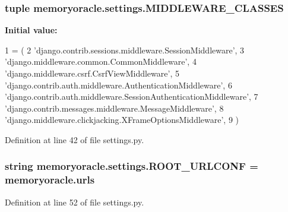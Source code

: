 \subsubsection[{M\+I\+D\+D\+L\+E\+W\+A\+R\+E\+\_\+\+C\+L\+A\+S\+S\+E\+S}]{\setlength{\rightskip}{0pt plus 5cm}tuple memoryoracle.\+settings.\+M\+I\+D\+D\+L\+E\+W\+A\+R\+E\+\_\+\+C\+L\+A\+S\+S\+E\+S}\label{namespacememoryoracle_1_1settings_a22348e05f0743ec99f37a8cf94154efc}
{\bfseries Initial value\+:}
\begin{DoxyCode}
1 = (
2     \textcolor{stringliteral}{'django.contrib.sessions.middleware.SessionMiddleware'},
3     \textcolor{stringliteral}{'django.middleware.common.CommonMiddleware'},
4     \textcolor{stringliteral}{'django.middleware.csrf.CsrfViewMiddleware'},
5     \textcolor{stringliteral}{'django.contrib.auth.middleware.AuthenticationMiddleware'},
6     \textcolor{stringliteral}{'django.contrib.auth.middleware.SessionAuthenticationMiddleware'},
7     \textcolor{stringliteral}{'django.contrib.messages.middleware.MessageMiddleware'},
8     \textcolor{stringliteral}{'django.middleware.clickjacking.XFrameOptionsMiddleware'},
9 )
\end{DoxyCode}


Definition at line 42 of file settings.\+py.

\hypertarget{namespacememoryoracle_1_1settings_a6c9ce7dd487f150eeac964208a5cdec6}{}
\subsubsection[{R\+O\+O\+T\+\_\+\+U\+R\+L\+C\+O\+N\+F}]{\setlength{\rightskip}{0pt plus 5cm}string memoryoracle.\+settings.\+R\+O\+O\+T\+\_\+\+U\+R\+L\+C\+O\+N\+F = \textquotesingle{}memoryoracle.\+urls\textquotesingle{}}\label{namespacememoryoracle_1_1settings_a6c9ce7dd487f150eeac964208a5cdec6}


Definition at line 52 of file settings.\+py.

\hypertarget{namespacememoryoracle_1_1settings_a8a181b7a3e7e47b16b6900941d5d6284}{}
